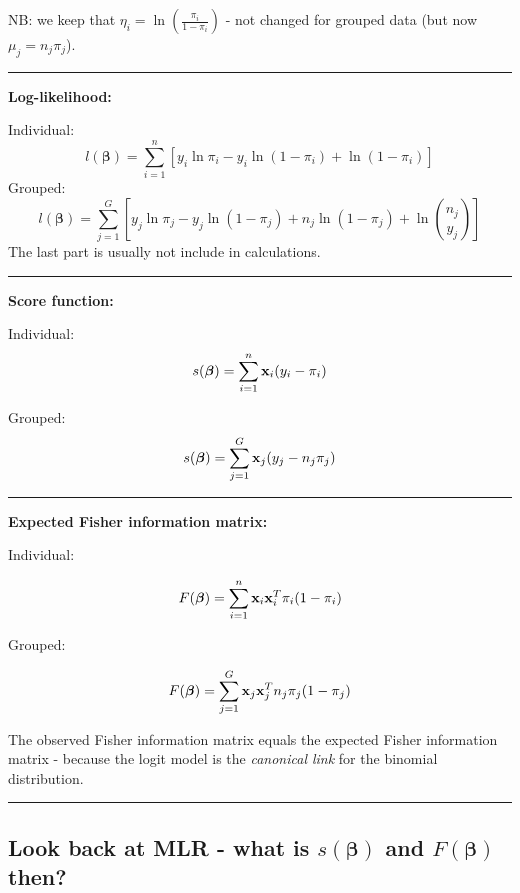 \documentclass[
]{article}
\begin{document}
NB: we keep that \(\eta_i=\ln (\frac{\pi_i}{1-\pi_i})\) - not changed
for grouped data (but now \(\mu_j=n_j\pi_j\)).

\begin{center}\rule{0.5\linewidth}{0.5pt}\end{center}

\textbf{Log-likelihood:}

Individual:
\[l(\boldsymbol{\beta})=\sum_{i=1}^n[y_i \ln \pi_i-y_i\ln(1-\pi_i)+\ln(1-\pi_i)]\]
Grouped:
\[l(\boldsymbol{\beta})=\sum_{j=1}^G[y_j \ln \pi_j-y_j\ln(1-\pi_j)+n_j\ln(1-\pi_j)+ \ln {n_j \choose y_j}]\]
The last part is usually not include in calculations.

\begin{center}\rule{0.5\linewidth}{0.5pt}\end{center}

\textbf{Score function:}

Individual: \[s(\boldsymbol{\beta})=\sum_{i=1}^n {\bf x}_i (y_i-\pi_i)\]

Grouped: \[s(\boldsymbol{\beta})=\sum_{j=1}^G {\bf x}_j (y_j-n_j\pi_j)\]

\begin{center}\rule{0.5\linewidth}{0.5pt}\end{center}

\textbf{Expected Fisher information matrix:}

Individual:

\[F(\boldsymbol{\beta})=\sum_{i=1}^n {\bf x}_i {\bf x}_i^T\pi_i (1-\pi_i)\]

Grouped:

\[F(\boldsymbol{\beta})=\sum_{j=1}^G {\bf x}_j {\bf x}_j^T n_j \pi_j (1-\pi_j)\]

The observed Fisher information matrix equals the expected Fisher
information matrix - because the logit model is the \emph{canonical
link} for the binomial distribution.

\begin{center}\rule{0.5\linewidth}{0.5pt}\end{center}

\hypertarget{look-back-at-mlr---what-is-sboldsymbolbeta-and-fboldsymbolbeta-then}{%
\subsection{\texorpdfstring{Look back at MLR - what is
\(s(\boldsymbol{\beta})\) and \(F(\boldsymbol{\beta})\)
then?}{Look back at MLR - what is s(\textbackslash boldsymbol\{\textbackslash beta\}) and F(\textbackslash boldsymbol\{\textbackslash beta\}) then?}}\label{look-back-at-mlr---what-is-sboldsymbolbeta-and-fboldsymbolbeta-then}}
\end{document}
